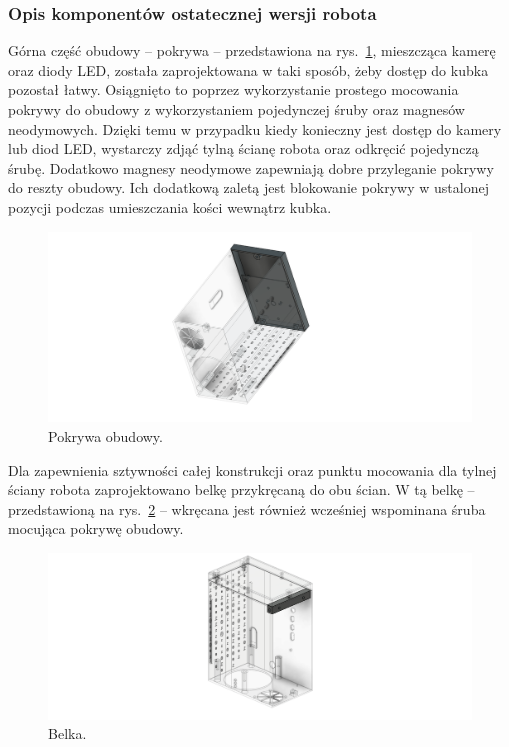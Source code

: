 \subsubsection{Opis komponentów ostatecznej wersji robota}

Górna część obudowy -- pokrywa -- przedstawiona na rys.~\ref{fig:pokrywa}, mieszcząca kamerę oraz diody LED, została zaprojektowana w taki sposób, żeby dostęp do kubka pozostał łatwy. Osiągnięto to
poprzez wykorzystanie prostego mocowania pokrywy do obudowy z wykorzystaniem pojedynczej śruby oraz magnesów neodymowych. Dzięki temu w przypadku kiedy konieczny
jest dostęp do kamery lub diod LED, wystarczy zdjąć tylną ścianę robota oraz odkręcić pojedynczą śrubę. Dodatkowo magnesy neodymowe zapewniają
dobre przyleganie pokrywy do reszty obudowy. Ich dodatkową zaletą jest blokowanie pokrywy w ustalonej pozycji podczas umieszczania kości wewnątrz
kubka.

\begin{figure}[H]
    \centering
    \includegraphics[width=0.95\linewidth]{chapters/03-praca-wlasna/figures/pokrywa}
    \caption{\label{fig:pokrywa}Pokrywa obudowy.}
\end{figure}

Dla zapewnienia sztywności całej konstrukcji oraz punktu mocowania dla tylnej ściany robota zaprojektowano belkę przykręcaną do obu ścian. W tą belkę -- przedstawioną na rys.~\ref{fig:belka} --
wkręcana jest również wcześniej wspominana śruba mocująca pokrywę obudowy.

\begin{figure}[H]
    \centering
    \includegraphics[width=0.95\linewidth]{chapters/03-praca-wlasna/figures/belka}
    \caption{\label{fig:belka}Belka.}
\end{figure}

